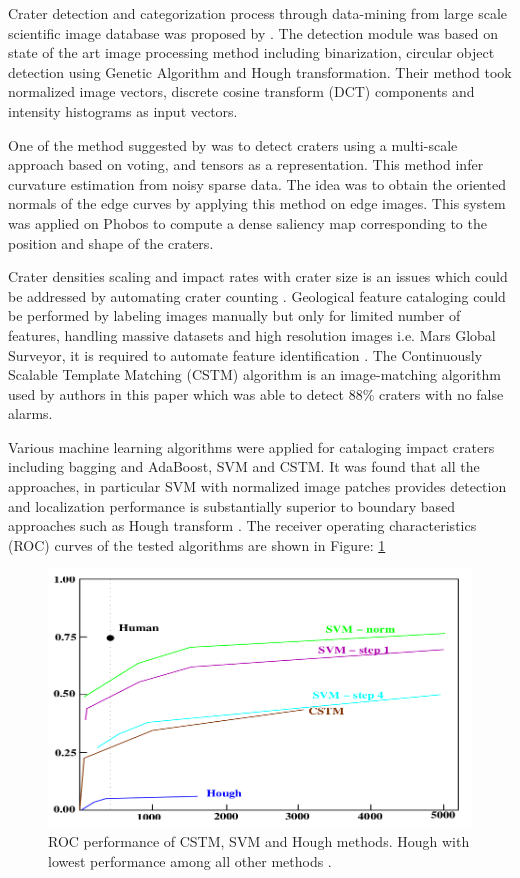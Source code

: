 \documentclass[11pt]{article}
\begin{document}
Crater detection and categorization process through data-mining from large scale scientific image database was proposed by \cite{honda2000crater}. The detection module was based on state of the art image processing method including binarization, circular object detection using Genetic Algorithm and Hough transformation. Their method took normalized image vectors, discrete cosine transform (DCT) components and intensity histograms as input vectors.

One of the method suggested by \cite{leroy2001crater} was to detect craters using a multi-scale approach based on voting, and tensors as a representation. This method infer curvature estimation from noisy sparse data. The idea was to obtain the oriented normals of the edge curves by applying this method on edge images. This system was applied on Phobos to compute a dense saliency map corresponding to the position and shape of the craters.

Crater densities scaling and impact rates with crater size is an issues which could be addressed by automating crater counting \cite{vinogradova2002training}. Geological feature cataloging could be performed by labeling images manually but only for limited number of features, handling massive datasets and high resolution images i.e. Mars Global Surveyor, it is required to automate feature identification \cite{vinogradova2002training}. The Continuously Scalable Template Matching (CSTM) algorithm is an image-matching algorithm used by authors in this paper which was able to detect 88\% craters with no false alarms.

Various machine learning algorithms were applied for cataloging impact craters including bagging and AdaBoost, SVM and CSTM. It was found that all the approaches, in particular SVM with normalized image patches provides detection and localization performance is substantially superior to boundary based approaches such as Hough transform  \cite{wetzler2005learning}. The receiver operating characteristics (ROC) curves of the tested algorithms are shown in Figure: \ref{roc,wetzler}

\begin{figure}[ht!]
	\centering
	\includegraphics[width=.6\textwidth]{files/literature/roc_wetzler.png}
	\caption{ROC performance of CSTM, SVM and Hough methods. Hough with lowest performance among all other methods \cite{wetzler2005learning}.}
	\label{roc,wetzler}
\end{figure}
\end{document}
